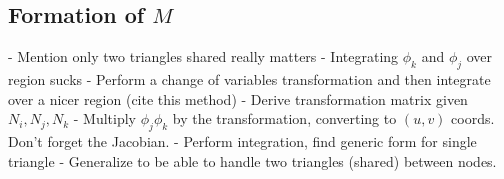 \subsection{Formation of $M$}

- Mention only two triangles shared really matters
- Integrating $\phi_k$ and $\phi_j$ over region sucks
- Perform a change of variables transformation and then integrate over a nicer region (cite this method)
    - Derive transformation matrix given $N_i, N_j, N_k$
    - Multiply $\phi_j \phi_k$ by the transformation, converting to $(u,v)$ coords. Don't forget the Jacobian.
    - Perform integration, find generic form for single triangle
    - Generalize to be able to handle two triangles (shared) between nodes.
